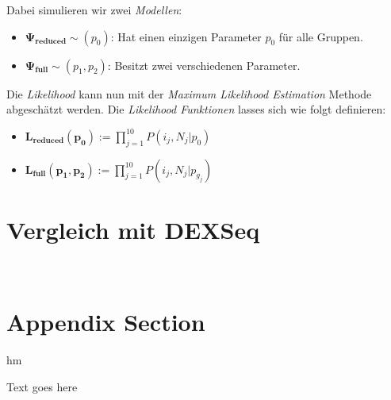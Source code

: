 \documentclass[12pt]{article}
\begin{document}
Dabei simulieren wir zwei \textit{Modellen}:
\begin{itemize}
    \item $\mathbf{\Psi_{reduced}} \sim(p_{0})$: Hat einen einzigen Parameter $p_{0}$ für alle Gruppen.
    \item $\mathbf{\Psi_{full}} \sim(p_{1}, p_{2})$: Besitzt zwei verschiedenen Parameter.
\end{itemize}

Die \textit{Likelihood} kann nun mit der \textit{Maximum Likelihood Estimation} Methode
abgeschätzt werden.
Die \textit{Likelihood Funktionen} lasses sich wie folgt definieren:
\begin{itemize}
    \item $\mathbf{L_{reduced}(p_{0})} := \prod_{j = 1}^{10}P(i_{j},N_{j}|p_{0})$
    \item $\mathbf{L_{full}(p_{1}, p_{2})} := \prod_{j = 1}^{10}P(i_{j},N_{j}|p_{g_{j}})$
\end{itemize}


\section{Vergleich mit DEXSeq}







\newpage~\appendix

\section{Appendix Section}

hm 

Text goes here
\end{document}
